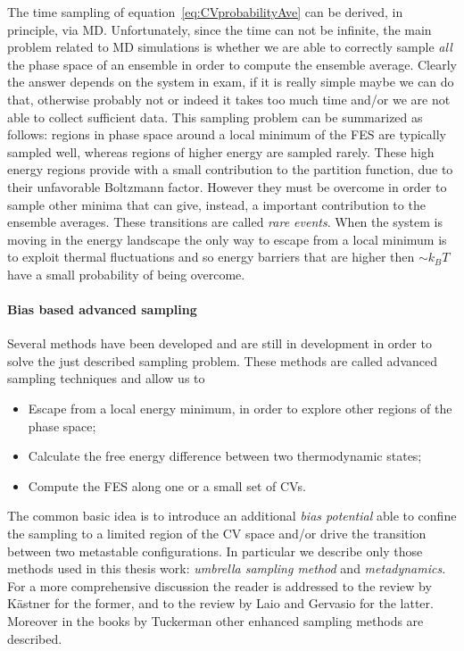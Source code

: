 The time sampling of equation~\eqref{eq:CVprobabilityAve} can be
derived, in principle, via \ac{MD}. Unfortunately, since the time can not be infinite, the main problem related
to \ac{MD} simulations is whether we are able to correctly sample \textit{all} the phase space of an ensemble in
order to compute the ensemble average. Clearly the answer depends on the system in exam, if it is really simple
maybe we can do that, otherwise probably not or indeed it takes too much time and/or we are not able to collect
sufficient data. This sampling problem can be summarized as follows: regions in phase space around a local
minimum of the \ac{FES} are typically sampled well, whereas regions of higher energy are sampled rarely. These
high energy regions provide with a small contribution to the partition function, due to their unfavorable
Boltzmann factor. However they must be overcome in order to sample other minima that can give, instead, a
important contribution to the ensemble averages. These transitions are called \textit{rare events}. When the
system is moving in the energy landscape the only way to escape from a local minimum is to exploit thermal
fluctuations and so energy barriers that are higher then $\sim k_B T$ have a small probability of being overcome.

\paragraph{\textbf{Bias based advanced sampling}} Several methods have been developed and are still in development 
in order to solve the just described sampling problem. These methods are called advanced sampling techniques
and allow us to
\begin{itemize}
	\item Escape from a local energy minimum, in order to explore other regions of the phase space;
	\item Calculate the free energy difference between two thermodynamic states;
	\item Compute the \ac{FES} along one or a small set of \acp{CV}.
\end{itemize}
The common basic idea is to introduce an additional \textit{bias potential} able to confine the sampling to a
limited region of the \ac{CV} space and/or drive the transition between two metastable configurations. In
particular we describe only those methods used in this thesis work: \textit{umbrella sampling method} and
\textit{metadynamics}. For a more comprehensive discussion the reader is addressed to the review by Kästner
\cite{Umbrella} for the former, and to the review by Laio and Gervasio \cite{MetadReview} for the latter.
Moreover in the books by Tuckerman \cite{Tuckerman} other enhanced sampling methods are described.

